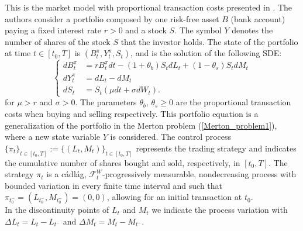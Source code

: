 This is the market model with proportional transaction costs presented in \cite{DaPaZa93}. 
The authors consider a portfolio composed by one risk-free asset $B$ (bank account) paying a fixed interest rate $r > 0$ and a stock $S$. 
The symbol $Y$ denotes the number of shares of the stock $S$ that the investor holds. 
The state of the portfolio at time $t\in [t_0,T]$ is $(B^{\pi}_t,Y^{\pi}_t,S_t)$, and is the solution of the following SDE:
\begin{equation}\label{DPZ_porfolio_dynamics}
 \begin{cases}
 dB^{\pi}_t &=  rB^{\pi}_t dt - (1+\theta_b)S_t dL_t + (1-\theta_s) S_t dM_t \\
 dY^{\pi}_t &=  dL_t - dM_t \\
 dS_t &=  S_t \left( \mu dt + \sigma dW_t \right).
\end{cases}
\end{equation} 
for $\mu>r$ and $\sigma>0$.
The parameters $\theta_b$, $\theta_s \geq 0$ are the proportional transaction costs when buying and selling respectively.
This portfolio equation is a generalization of the portfolio in the Merton problem (\ref{Merton_problem1}), 
where a new state variable $Y$ is considered.
The control process $\{\pi_t\}_{t \in [t_0,T]} := \{(L_t,M_t)\}_{t \in [t_0,T]}$ represents the trading strategy and indicates the 
cumulative number of shares bought and sold, respectively, in $[t_0,T]$.
The strategy $\pi_t$ is a cádlág, $\mathcal{F}^W_t$-progressively measurable, nondecreasing process with bounded variation in every finite time interval and such that
$ \pi_{t_0^-} = ( L_{t_0^-} , M_{t_0^-} ) = (0,0) $, allowing for an initial transaction at $t_0$.\\
In the discontinuity points of $L_t$ and $M_t$ we indicate the process variation with $\Delta L_t= L_{t}-L_{t^-}$ and $\Delta M_t= M_{t}-M_{t^-}$.




